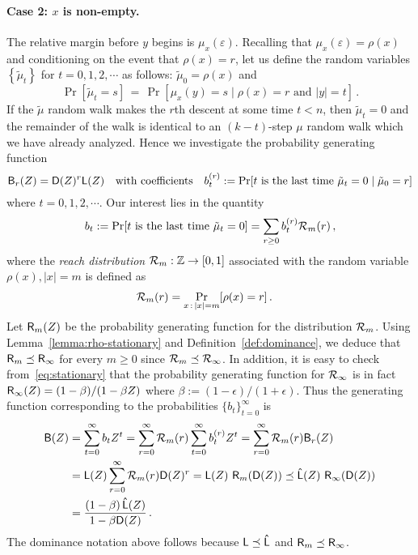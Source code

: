 	\paragraph{Case 2: $x$ is non-empty.}
        The relative margin before $y$ begins is $\mu_x(\varepsilon)$.
        Recalling that $\mu_x(\varepsilon) = \rho(x)$ and conditioning on the event that $\rho(x) = r$, 
    let us define the random variables $\left\{ \tilde{\mu}_t \right\}$ for $t = 0, 1, 2, \cdots$ as follows: $\tilde{\mu}_0 = \rho(x)$ and
    \[
      \Pr[\tilde{\mu}_t = s]\, =\, \Pr[\mu_x(y) = s \mid \rho(x) = r \text{ and } |y| = t ]
      \, .
    \]
    If the $\tilde{\mu}$ random walk makes the $r$th descent at some time $t < n$, then $\tilde{\mu}_t = 0$ and the remainder of the walk is 
	identical to an $(k-t)$-step $\mu$ random walk which we have already analyzed. 
	Hence we investigate the probability generating function
	\[
			\mathsf{B}_r(Z) = \mathsf{D}(Z)^r \mathsf{L}(Z) \quad \text{with coefficients} \quad
      b^{(r)}_t := \Pr[t \text{ is the last time } \tilde{\mu}_t = 0 \mid \tilde{\mu}_0 = r]	
  \]
  where $t = 0, 1, 2, \cdots$. Our interest lies in the quantity 
    \[
      b_t 
      := \Pr[t \text{ is the last time } \tilde{\mu}_t = 0] 
      = \sum_{r\geq 0}{  b^{(r)}_t \mathcal{R}_m(r) } 
      \,,
     \]
  where the \emph{reach distribution} 
  $\mathcal{R}_m : \mathbb{Z} \rightarrow [0,1]$ 
  associated with the random variable $\rho(x), |x| = m$ is defined as 
  \begin{align}\label{eq:dist-rho}
    \mathcal{R}_m(r) &= \Pr_{x \, : \, |x| = m}[\rho(x) = r]
    \, .
  \end{align}
     Let $\mathsf{R}_m(Z)$ be the probability generating function
     for the distribution $\mathcal{R}_m$. 
     Using Lemma~\ref{lemma:rho-stationary} and Definition~\ref{def:dominance}, we deduce that
     $\mathsf{R}_m \preceq \mathsf{R}_\infty$ for every $m \geq 0$ since 
    $\mathcal{R}_m \preceq \mathcal{R}_\infty$.
     In addition, it is easy to check from~\eqref{eq:stationary} that
     the probability generating function for $\mathcal{R}_\infty$ is in fact
     $\mathsf{R}_\infty(Z) = (1-\beta)/(1-\beta Z)$ where $\beta := (1-\epsilon)/(1+\epsilon)$. 
    Thus the generating function corresponding to the
     probabilities $\{b_t\}_{t=0}^\infty$ is
	\begin{align}
		\mathsf{B}(Z) 
		&= \sum_{t=0}^\infty{b_t Z^t} = \sum_{r=0}^\infty{\mathcal{R}_m(r) \sum_{t=0}^\infty{b_t^{(r)} Z^t} } = \sum_{r=0}^\infty{\mathcal{R}_m(r) \mathsf{B}_r(Z) } \nonumber \\
    &= \mathsf{L}(Z) \sum_{r=0}^\infty{\mathcal{R}_m(r) \mathsf{D}(Z)^r}    \nonumber 
		= \mathsf{L}(Z)\  \mathsf{R}_m (\mathsf{D}(Z)) \nonumber 
		\preceq \mathsf{\hat{L}}(Z)\  \mathsf{R}_\infty (\mathsf{D}(Z))  \nonumber \\
    &= \frac{(1-\beta)\,\mathsf{\hat{L}}(Z) }{1 - \beta \mathsf{D}(Z)}
		\, .
	\label{eq:gf-mu-relative}
	\end{align}
  The dominance notation above follows because
  $\mathsf{L} \preceq \mathsf{\hat{L}}$ and $\mathsf{R}_m \preceq \mathsf{R}_\infty$.


